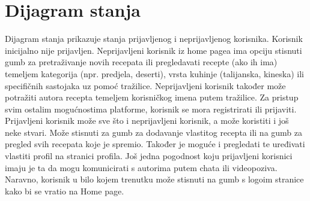 			
			
			
		
		\section{Dijagram stanja}

		\noindent Dijagram stanja prikazuje stanja prijavljenog i neprijavljenog korisnika. Korisnik inicijalno nije prijavljen. Neprijavljeni korisnik iz home pagea ima opciju stisnuti gumb za pretraživanje novih recepata ili pregledavati recepte (ako ih ima) temeljem kategorija (npr. predjela, deserti), vrsta kuhinje (talijanska, kineska) ili specifičnih sastojaka uz pomoć tražilice. Neprijavljeni korisnik također može potražiti autora recepta temeljem korisničkog imena putem tražilice. Za pristup svim ostalim mogućnostima platforme, korisnik se mora registrirati ili prijaviti. Prijavljeni korisnik može sve što i neprijavljeni korisnik, a može koristiti i još neke stvari. Može stisnuti za gumb za dodavanje vlastitog recepta ili na gumb za pregled svih recepata koje je spremio. Također je moguće i pregledati te uređivati vlastiti profil na stranici profila. Još jedna pogodnost koju prijavljeni korisnici imaju je ta da mogu komunicirati s autorima putem chata ili videopoziva. Naravno, korisnik u bilo kojem trenutku može stisnuti na gumb s logoim stranice kako bi se vratio na Home page. 

		\eject
			
